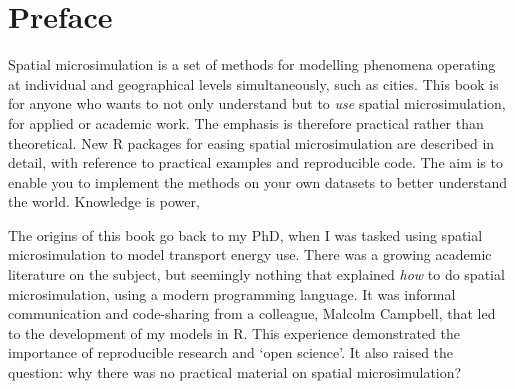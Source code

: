 \chapter*{Preface}

Spatial microsimulation is a set of methods for modelling phenomena operating
at individual and geographical levels simultaneously, such as cities.
This book is for anyone who wants to not only understand
but to \emph{use} spatial microsimulation, for applied or academic work.
The emphasis is therefore practical rather than theoretical.
New R packages for easing spatial microsimulation are described in
detail, with reference to practical examples and reproducible code.
The aim is to enable you to implement the methods on your own
datasets to better understand the world. 
Knowledge is power, 


The origins of this book go back to my PhD, when
I was tasked using spatial microsimulation to model transport energy use.
There was a growing academic literature on the subject,
but seemingly nothing that explained \emph{how} to do spatial microsimulation,
using a modern programming language.
It was informal communication and code-sharing from a colleague,
Malcolm Campbell, that led to the development of my models in R.
This experience demonstrated the importance of
reproducible research and `open science'. It also raised the question:
why there was no practical material on spatial microsimulation?


